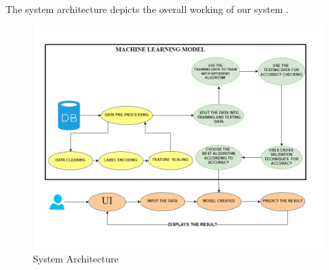 \documentclass[12pt]{article}
\begin{document}
The system architecture depicts the overall working of our system .
\begin{figure}[H]
\begin{center}
\includegraphics[scale=.7]{ML1}
\caption{System Architecture}
\end{center}
\end{figure}
\end{document}
